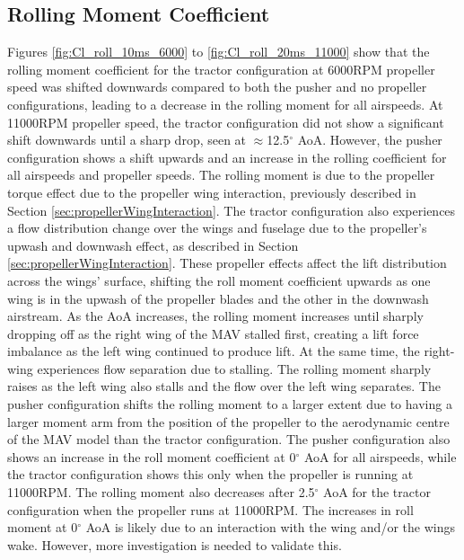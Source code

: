 \subsection{Rolling Moment Coefficient}

Figures \ref{fig:Cl_roll_10ms_6000} to \ref{fig:Cl_roll_20ms_11000} show that the rolling moment coefficient for the tractor configuration at 6000RPM propeller speed was shifted downwards compared to both the pusher and no propeller configurations, leading to a decrease in the rolling moment for all airspeeds. At 11000RPM propeller speed, the tractor configuration did not show a significant shift downwards until a sharp drop, seen at $\approx$12.5$^{\circ}$ \acrshort{AoA}. However, the pusher configuration shows a shift upwards and an increase in the rolling coefficient for all airspeeds and propeller speeds. The rolling moment is due to the propeller torque effect due to the propeller wing interaction, previously described in Section \ref{sec:propellerWingInteraction}. The tractor configuration also experiences a flow distribution change over the wings and fuselage due to the propeller's upwash and downwash effect, as described in Section \ref{sec:propellerWingInteraction}. These propeller effects affect the lift distribution across the wings' surface, shifting the roll moment coefficient upwards as one wing is in the upwash of the propeller blades and the other in the downwash airstream. As the \acrshort{AoA} increases, the rolling moment increases until sharply dropping off as the right wing of the \acrshort{MAV} stalled first, creating a lift force imbalance as the left wing continued to produce lift. At the same time, the right-wing experiences flow separation due to stalling. The rolling moment sharply raises as the left wing also stalls and the flow over the left wing separates. The pusher configuration shifts the rolling moment to a larger extent due to having a larger moment arm from the position of the propeller to the aerodynamic centre of the \acrshort{MAV} model than the tractor configuration. The pusher configuration also shows an increase in the roll moment coefficient at 0$^{\circ}$ \acrshort{AoA} for all airspeeds, while the tractor configuration shows this only when the propeller is running at 11000RPM. The rolling moment also decreases after 2.5$^{\circ}$ \acrshort{AoA} for the tractor configuration when the propeller runs at 11000RPM. The increases in roll moment at 0$^{\circ}$ \acrshort{AoA} is likely due to an interaction with the wing and/or the wings wake. However, more investigation is needed to validate this.  

